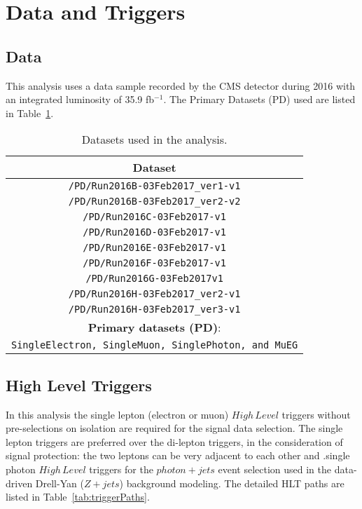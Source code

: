 \section{Data and Triggers}
\subsection{Data}
This analysis uses a data sample recorded by the CMS detector during 2016 with an integrated luminosity of 35.9 fb$^{-1}$. The Primary Datasets (PD) used are listed in Table~\ref{tab:samples_data}. 
\begin{table}[htbp]
  \begin{center}
    \caption{Datasets used in the analysis. \label{tab:samples_data}}
    \begin{tabular}{c}
      \hline\hline
      Dataset   \\
      \hline
      \texttt{/PD/Run2016B-03Feb2017\_ver1-v1} \\ 
      \texttt{/PD/Run2016B-03Feb2017\_ver2-v2}  \\
      \texttt{/PD/Run2016C-03Feb2017-v1}  \\
      \texttt{/PD/Run2016D-03Feb2017-v1}  \\
      \texttt{/PD/Run2016E-03Feb2017-v1}  \\
      \texttt{/PD/Run2016F-03Feb2017-v1}  \\
      \texttt{/PD/Run2016G-03Feb2017v1}  \\
      \texttt{/PD/Run2016H-03Feb2017\_ver2-v1}  \\
      \texttt{/PD/Run2016H-03Feb2017\_ver3-v1}  \\
      \hline
      \textbf{Primary datasets (PD)}: \\
      \texttt{SingleElectron, SingleMuon, SinglePhoton, and MuEG}\\ \hline
      \hline\hline
    \end{tabular}
  \end{center}
\end{table}

\subsection{High Level Triggers}\label{sec:samples_hlt}
In this analysis the single lepton (electron or muon) $High\,Level$ triggers without pre-selections on isolation are required for the signal data selection. The single lepton triggers are preferred over the di-lepton triggers, in the consideration of signal protection: the two leptons can be very adjacent to each other and .single photon $High\,Level$ triggers for the $photon+jets$ event selection used in the data-driven Drell-Yan ($Z+jets$) background modeling. The detailed HLT paths are listed in Table~\ref{tab:triggerPaths}. 

